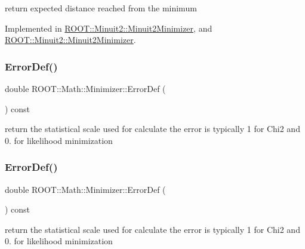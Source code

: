 return expected distance reached from the minimum 



Implemented in \mbox{\hyperlink{classROOT_1_1Minuit2_1_1Minuit2Minimizer_ab9c1bfaaaf4c12acd1fd96ece3509269}{R\+O\+O\+T\+::\+Minuit2\+::\+Minuit2\+Minimizer}}, and \mbox{\hyperlink{classROOT_1_1Minuit2_1_1Minuit2Minimizer_ab9c1bfaaaf4c12acd1fd96ece3509269}{R\+O\+O\+T\+::\+Minuit2\+::\+Minuit2\+Minimizer}}.

\mbox{\label{classROOT_1_1Math_1_1Minimizer_aa4e46f31bb8dfb770fcb704e585a3593}} 
\subsubsection{\texorpdfstring{ErrorDef()}{ErrorDef()}\hspace{0.1cm}{\footnotesize\ttfamily [1/2]}}
{\footnotesize\ttfamily double R\+O\+O\+T\+::\+Math\+::\+Minimizer\+::\+Error\+Def (\begin{DoxyParamCaption}{ }\end{DoxyParamCaption}) const\hspace{0.3cm}{\ttfamily [inline]}}

return the statistical scale used for calculate the error is typically 1 for Chi2 and 0. for likelihood minimization \mbox{\label{classROOT_1_1Math_1_1Minimizer_aa4e46f31bb8dfb770fcb704e585a3593}} 
\subsubsection{\texorpdfstring{ErrorDef()}{ErrorDef()}\hspace{0.1cm}{\footnotesize\ttfamily [2/2]}}
{\footnotesize\ttfamily double R\+O\+O\+T\+::\+Math\+::\+Minimizer\+::\+Error\+Def (\begin{DoxyParamCaption}{ }\end{DoxyParamCaption}) const\hspace{0.3cm}{\ttfamily [inline]}}

return the statistical scale used for calculate the error is typically 1 for Chi2 and 0. for likelihood minimization \mbox{\label{classROOT_1_1Math_1_1Minimizer_a42f71e22f16cf4c59b621cf7e1e75f3d}} 
